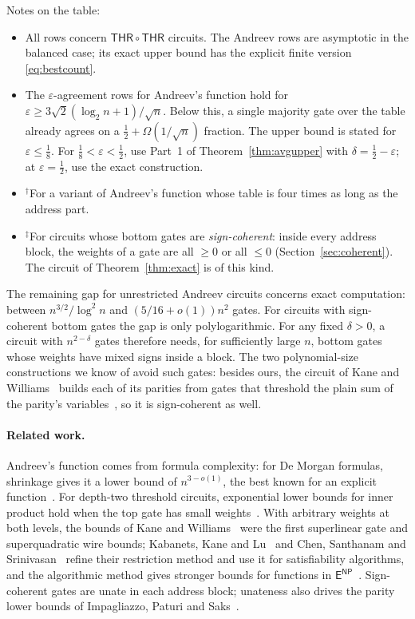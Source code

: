 \documentclass[11pt,letterpaper]{article}
\theoremstyle{remark}
\newcommand{\THR}{\mathsf{THR}}
\begin{document}
Notes on the table:
\begin{itemize}
\item All rows concern $\THR\circ\THR$ circuits.
      The Andreev rows are asymptotic in the balanced case; its exact upper
      bound has the explicit finite version \eqref{eq:bestcount}.
\item The $\varepsilon$-agreement rows for Andreev's function hold for
      $\varepsilon\ge3\sqrt2(\log_2n+1)/\sqrt n$. Below this, a single
      majority gate over the table already agrees on a
      $\tfrac12+\Omega(1/\sqrt n)$ fraction. The upper bound is stated for
      $\varepsilon\le\tfrac18$. For $\tfrac18<\varepsilon<\tfrac12$, use
      Part~1 of Theorem~\ref{thm:avgupper} with $\delta=\tfrac12-\varepsilon$;
      at $\varepsilon=\tfrac12$, use the exact construction.
\item $^\dagger$For a variant of Andreev's function whose table is four times
      as long as the address part.
\item $^\ddagger$For circuits whose bottom gates are \emph{sign-coherent}:
      inside every address block, the weights of a gate are all $\ge0$ or
      all $\le0$ (Section~\ref{sec:coherent}). The circuit of
      Theorem~\ref{thm:exact} is of this kind.
\end{itemize}

The remaining gap for unrestricted Andreev circuits concerns exact computation: between
$n^{3/2}/\log^2n$ and $(5/16+o(1))n^2$ gates. For circuits with sign-coherent
bottom gates the gap is only polylogarithmic. For any fixed $\delta>0$, a circuit with $n^{2-\delta}$
gates therefore needs, for sufficiently large $n$, bottom gates whose
weights have mixed signs inside a block. The two
polynomial-size constructions we know of avoid such gates: besides ours, the
circuit of Kane and Williams~\cite[Thm.~1.2]{KW} builds each of its parities
from gates that threshold the plain sum of the parity's
variables~\cite[Prop.~2.1]{HMPST}, so it is sign-coherent as well.

\paragraph*{Related work.}
Andreev's function comes from formula complexity: for De Morgan formulas,
shrinkage gives it a lower bound of $n^{3-o(1)}$, the best known for an
explicit function~\cite{And87,Has98,Tal14}. For depth-two threshold circuits,
exponential lower bounds for inner product hold when the top gate has small
weights~\cite{HMPST,Nis93}. With arbitrary weights at both
levels, the bounds of Kane and Williams~\cite{KW} were the first superlinear
gate and superquadratic wire bounds; Kabanets, Kane and Lu~\cite{KKL} and Chen,
Santhanam and Srinivasan~\cite{CSS} refine their restriction method and use it
for satisfiability algorithms, and the algorithmic method gives stronger
bounds for functions in $\mathsf E^{\mathsf{NP}}$~\cite{Tam,ACW,CTW}.
Sign-coherent gates are unate in each address block; unateness also drives
the parity lower bounds of Impagliazzo, Paturi and Saks~\cite{IPS}.
\end{document}
